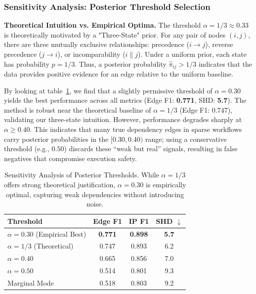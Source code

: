 \documentclass{article}
\theoremstyle{plain}
\theoremstyle{definition}
\theoremstyle{remark}
\begin{document}
\subsubsection{Sensitivity Analysis: Posterior Threshold Selection}
\label{subsec:threshold_sensitivity}
\noindent \textbf{Theoretical Intuition vs. Empirical Optima.}
The threshold $\alpha = 1/3 \approx 0.33$ is theoretically motivated by a "Three-State" prior. For any pair of nodes $(i, j)$, there are three mutually exclusive relationships: precedence ($i \to j$), reverse precedence ($j \to i$), or incomparability ($i \parallel j$). Under a uniform prior, each state has probability $p=1/3$. Thus, a posterior probability $\hat{\pi}_{ij} > 1/3$ indicates that the data provides positive evidence for an edge relative to the uniform baseline.

By looking at table~\ref{tab:threshold_comparison}, we find that a slightly permissive threshold of $\alpha=0.30$ yields the best performance across all metrics (Edge F1: \textbf{0.771}, SHD: \textbf{5.7}). The method is robust near the theoretical baseline of $\alpha=1/3$ (Edge F1: $0.747$), validating our three-state intuition. However, performance degrades sharply at $\alpha \ge 0.40$. This indicates that many true dependency edges in sparse workflows carry posterior probabilities in the $[0.30, 0.40)$ range; using a conservative threshold (e.g., $0.50$) discards these ``weak but real'' signals, resulting in false negatives that compromise execution safety.

\begin{table}[h]
\centering
\caption{Sensitivity Analysis of Posterior Thresholds. While $\alpha=1/3$ offers strong theoretical justification, $\alpha=0.30$ is empirically optimal, capturing weak dependencies without introducing noise.}
\label{tab:threshold_comparison}
\small
\begin{tabular}{l c c c}
\toprule
\textbf{Threshold} & \textbf{Edge F1} & \textbf{IP F1} & \textbf{SHD} $\downarrow$ \\
\midrule
$\alpha=0.30$ (Empirical Best) & \textbf{0.771} & \textbf{0.898} & \textbf{5.7} \\
$\alpha=1/3$ (Theoretical) & 0.747 & 0.893 & 6.2 \\
$\alpha=0.40$ & 0.665 & 0.856 & 7.0 \\
$\alpha=0.50$ & 0.514 & 0.801 & 9.3 \\
\midrule
Marginal Mode & 0.518 & 0.803 & 9.2 \\
\bottomrule
\end{tabular}
\end{table}
\end{document}
